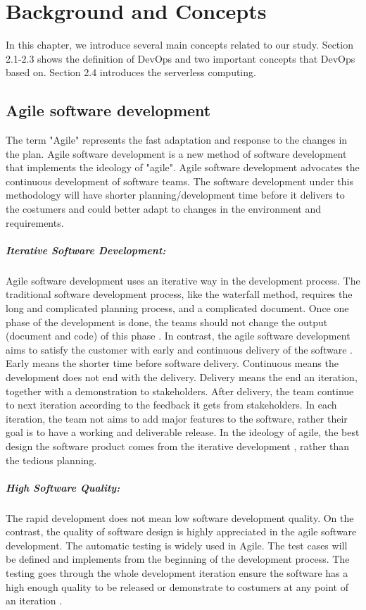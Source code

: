 \chapter{Background and Concepts}
In this chapter, we introduce several main concepts related to our study. Section 2.1-2.3 shows the definition of DevOps and two important concepts that DevOps based on. Section 2.4 introduces the serverless computing.
\section{Agile software development}
\label{agile}
The term "Agile" represents the fast adaptation and response to the changes in the plan\cite{highsmith2002agile}.
Agile software development is a new method of software development that implements the ideology of "agile". Agile software development advocates the continuous development of software teams. The software development under this methodology will have shorter planning/development time before it delivers to the costumers and could better adapt to changes in the environment and requirements.
\paragraph{Iterative Software Development:} Agile software development uses an iterative way in the development process. The traditional software development process, like the waterfall method, requires the long and complicated planning process, and a complicated document. Once one phase of the development is done, the teams should not change the output (document and code) of this phase \cite{cusumano1995beyond}. In contrast, the agile software development aims to satisfy the customer with early and continuous delivery of the software \cite{beck2001manifesto}. Early means the shorter time before software delivery. Continuous means the development does not end with the delivery. Delivery means the end an iteration, together with a demonstration to stakeholders. After delivery, the team continue to next iteration according to the feedback it gets from stakeholders. In each iteration, the team not aims to add major features to the software, rather their goal \cite{beck1999embracing} is to have a working and deliverable release. In the ideology of agile, the best design the software product comes from the iterative development \cite{beck2001manifesto}, rather than the tedious planning.
\paragraph{High Software Quality:} The rapid development does not mean low software development quality. On the contrast, the quality of software design is highly appreciated in the agile software development. The automatic testing is widely used in Agile. The test cases will be defined and implements from the beginning of the development process. The testing goes through the whole development iteration ensure the software has a high enough quality to be released or demonstrate to costumers at any point of an iteration \cite{Agilesof32:online}.
